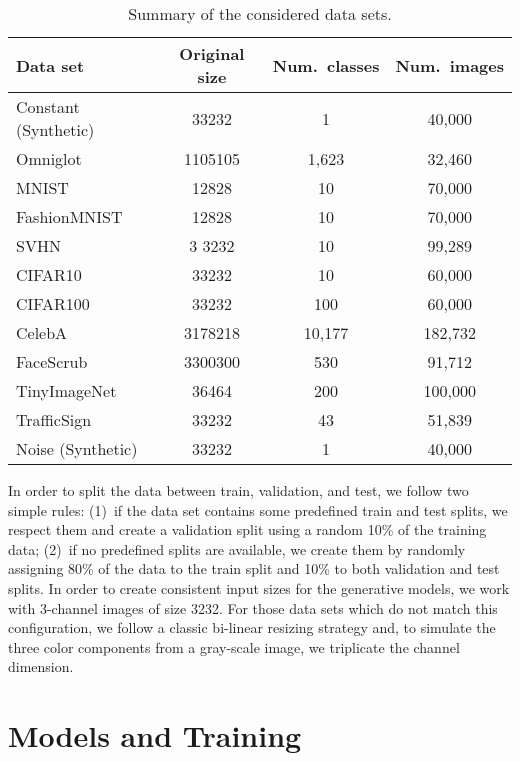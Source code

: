 \documentclass[letterpaper]{article} \usepackage{iclr2020_conference,times}
\begin{document}
\begin{table}[ht]
\caption{Summary of the considered data sets.}
\label{tab:datasets_summary}
\begin{center}
\setlength\tabcolsep{10pt}
\begin{tabular}{l|ccc}
\hline
Data set & Original size & Num.\ classes & Num.\ images \\
\hline
Constant (Synthetic) & 33232 & 1 & 40,000 \\
Omniglot \citep{DatasetOmniglot} & 1105105 & 1,623 & 32,460 \\
MNIST \citep{DatasetMNIST} & 12828 & 10 & 70,000 \\
FashionMNIST \citep{DatasetFashionMNIST} & 12828 & 10 & 70,000 \\
SVHN \citep{DatasetSVHN} &3 3232 & 10 & 99,289 \\
CIFAR10 \citep{DatasetCIFAR} & 33232 & 10 & 60,000 \\
CIFAR100 \citep{DatasetCIFAR} & 33232 & 100 & 60,000 \\
CelebA \citep{DatasetCelebA} & 3178218 & 10,177 & 182,732 \\
FaceScrub \citep{DatasetFacescrub} & 3300300  & 530 & 91,712 \\
TinyImageNet \citep{DatasetImagenet} & 36464 & 200 & 100,000 \\
TrafficSign \citep{DatasetTrafficsign} & 33232 & 43 & 51,839 \\
Noise (Synthetic) & 33232 & 1 & 40,000 \\
\hline
\end{tabular}
\end{center}
\end{table}

In order to split the data between train, validation, and test, we follow two simple rules: (1)~if the data set contains some predefined train and test splits, we respect them and create a validation split using a random 10\% of the training data; (2)~if no predefined splits are available, we create them by randomly assigning 80\% of the data to the train split and 10\% to both validation and test splits. In order to create consistent input sizes for the generative models, we work with 3-channel images of size 3232. For those data sets which do not match this configuration, we follow a classic bi-linear resizing strategy and, to simulate the three color components from a gray-scale image, we triplicate the channel dimension.


\section{Models and Training}
\label{sec:models}
\end{document}
